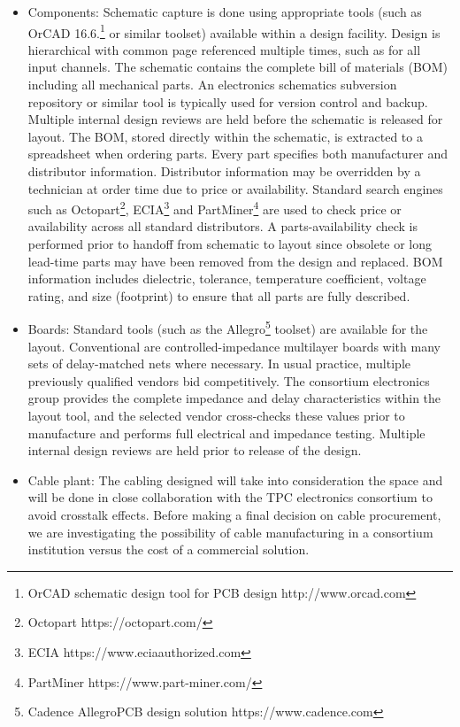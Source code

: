 \begin{itemize}

\item Components: Schematic capture is done using appropriate tools (such as OrCAD 16.6.\footnote{OrCAD\texttrademark{} schematic design tool for PCB design http://www.orcad.com} or similar toolset) available within a design facility. Design is hierarchical with common  page referenced multiple times, such as for all input channels. 
The schematic contains the complete bill of materials (BOM) including all mechanical parts. An electronics schematics subversion
repository or similar tool is typically used for version control and backup. Multiple internal design reviews are held before the schematic is released %
for layout. The BOM, stored directly within the schematic, is extracted to a spreadsheet when ordering parts. Every part specifies %
both manufacturer and distributor information. Distributor information may be overridden by a technician at order time due to price or availability. Standard search engines such as Octopart\footnote{Octopart https://octopart.com/}, ECIA\footnote{ ECIA https://www.eciaauthorized.com} and PartMiner\footnote{PartMiner https://www.part-miner.com/} are used to check price or availability across all standard distributors. A parts-availability check %
is performed prior to handoff from schematic to layout since %
obsolete or long lead-time parts %
may have been removed from the design and replaced. BOM information includes dielectric, tolerance, temperature coefficient, voltage rating, and size (footprint) to ensure that all parts are fully described.

\item Boards: Standard tools (such as the Allegro\footnote{Cadence Allegro\textregistered PCB design solution https://www.cadence.com} toolset) are available for the  layout. Conventional  are 
controlled-impedance multilayer boards with many sets of delay-matched nets where necessary.
In usual practice, multiple previously qualified vendors bid competitively. The consortium electronics group provides the complete impedance and delay characteristics  within the layout tool, and the selected vendor cross-checks these values prior to manufacture and performs full electrical and impedance testing.  Multiple internal design reviews are held prior to release of the design.

\item Cable plant: The cabling designed will take into consideration the  space and will be done in close collaboration with the TPC electronics consortium to avoid crosstalk effects.  
Before making a final decision on cable procurement, we are investigating the possibility of cable manufacturing in a  consortium institution versus the cost of a commercial solution.  


\end{itemize}
